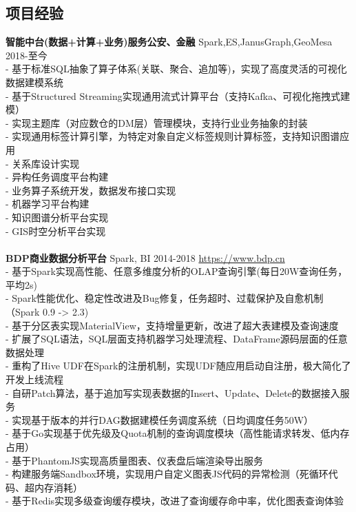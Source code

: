 \documentclass[UTF8,margin,line]{res}
\begin{document}
\begin{resume}
\section{\sc 项目经验}
\textbf{智能中台(数据+计算+业务)服务公安、金融} Spark,ES,JanusGraph,GeoMesa 2018-至今 \\
- 基于标准SQL抽象了算子体系(关联、聚合、追加等)，实现了高度灵活的可视化数据建模系统 \\
- 基于Structured Streaming实现通用流式计算平台（支持Kafka、可视化拖拽式建模） \\
- 实现主题库（对应数仓的DM层）管理模块，支持行业业务抽象的封装 \\
- 实现通用标签计算引擎，为特定对象自定义标签规则计算标签，支持知识图谱应用 \\
- 关系库设计实现 \\
- 异构任务调度平台构建 \\
- 业务算子系统开发，数据发布接口实现 \\
- 机器学习平台构建 \\
- 知识图谱分析平台实现 \\
- GIS时空分析平台实现 \\
\\
\textbf{BDP商业数据分析平台} Spark, BI 2014-2018 \url{https://www.bdp.cn} \\
- 基于Spark实现高性能、任意多维度分析的OLAP查询引擎(每日20W查询任务，平均2s) \\
- Spark性能优化、稳定性改进及Bug修复，任务超时、过载保护及自愈机制（Spark 0.9 -> 2.3) \\
- 基于分区表实现MaterialView，支持增量更新，改进了超大表建模及查询速度 \\
- 扩展了SQL语法，SQL层面支持机器学习处理流程、DataFrame源码层面的任意数据处理 \\
- 重构了Hive UDF在Spark的注册机制，实现UDF随应用启动自注册，极大简化了开发上线流程 \\
- 自研Patch算法，基于追加写实现表数据的Insert、Update、Delete的数据接入服务 \\
- 实现基于版本的并行DAG数据建模任务调度系统（日均调度任务50W） \\
- 基于Go实现基于优先级及Quota机制的查询调度模块（高性能请求转发、低内存占用） \\
- 基于PhantomJS实现高质量图表、仪表盘后端渲染导出服务 \\
- 构建服务端Sandbox环境，实现用户自定义图表JS代码的异常检测（死循环代码、超内存消耗） \\
- 基于Redis实现多级查询缓存模块，改进了查询缓存命中率，优化图表查询体验 \\

\end{resume}
\end{document}
